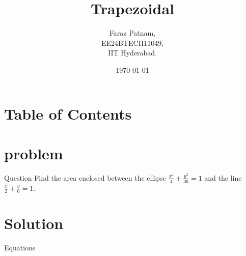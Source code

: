 \documentclass{beamer}
\title{Trapezoidal}
\author{Faraz Patnam,\\ EE24BTECH11049,\\IIT Hyderabad.\\}
\date{\today}
\theoremstyle{remark}
\numberwithin{equation}{section}
\begin{document}
		\begin{frame}
			\titlepage
		\end{frame}

		\section*{Table of Contents}
		\begin{frame}
			\tableofcontents
		\end{frame}
        \section{problem}
        \begin{frame}{Question}
            Find the area enclosed between the ellipse $\frac{x^2}{4}+\frac{y^2}{36} = 1$ and the line $\frac{x}{2} + \frac{y}{6} = 1$.
        \end{frame}

        \section{Solution}
        \begin{frame}{Equations}
            \begin{table}[!ht]
    \centering
    
    \caption{Equations}
    \label{tab:my_label}
\end{table}
        \end{frame}
\end{document}
